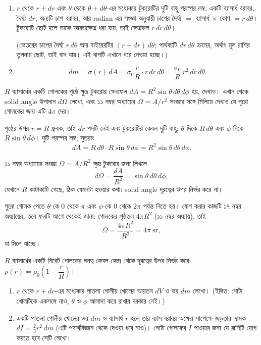 \documentclass[11pt]{article}
\begin{document}
\begin{sol}
\begin{enumerate}
  \item $r$ থেকে $r+dr$ এবং $\theta$ থেকে $\theta+d\theta$-এর মধ্যেকার
        টুকরোটির দুটি বাহু পরস্পর লম্ব: একটি ব্যাসার্ধ বরাবর, দৈর্ঘ্য $dr$;
        অন্যটি চাপ বরাবর, আর radian-এর সংজ্ঞা অনুযায়ী চাপের দৈর্ঘ্য
        $= $ ব্যাসার্ধ $\times$ কোণ $= r\,d\theta$। টুকরোটি ছোট হলে তাকে
        আয়তক্ষেত্র ধরা যায়, তাই ক্ষেত্রফল $r\,dr\,d\theta$।

        (ভেতরের চাপের দৈর্ঘ্য $r\,d\theta$ আর বাইরেরটির $(r+dr)\,d\theta$;
        পার্থক্যটি $dr\,d\theta$ ক্রমের, অর্থাৎ মূল রাশির তুলনায় ছোট, তাই
        বাদ যায়। এই ধাপটি এখানে ধরে নেওয়া হচ্ছে।)
  \item \[
          dm = \sigma(r)\,dA
             = \sigma_{0}\frac{r}{R} \cdot r\,dr\,d\theta
             = \frac{\sigma_{0}}{R}\,r^{2}\,dr\,d\theta .
        \]
\end{enumerate}
\end{sol}

 $R$ ব্যাসার্ধের একটি গোলকের পৃষ্ঠে ক্ষুদ্র টুকরোর ক্ষেত্রফল
$dA = R^{2}\sin\theta\,d\theta\,d\phi$ হয়, দেখাও। এখান থেকে solid angle
উপাদান $d\Omega$ লেখো, এবং ১১ নম্বর অধ্যায়ের $\Omega = A/r^{2}$ সংজ্ঞার
সঙ্গে মিলিয়ে দেখাও যে পুরো গোলকের জন্য এটি $4\pi$ দেয়।

\begin{sol}
পৃষ্ঠের উপর $r = R$ ধ্রুবক, তাই $dr$ পদটি নেই এবং টুকরোটির কেবল দুটি বাহু:
$\theta$ দিকে $R\,d\theta$ এবং $\phi$ দিকে $R\sin\theta\,d\phi$। দুটি পরস্পর
লম্ব, সুতরাং
\[
  dA = R\,d\theta \cdot R\sin\theta\,d\phi = R^{2}\sin\theta\,d\theta\,d\phi .
\]

১১ নম্বর অধ্যায়ের সংজ্ঞা $\Omega = A/R^{2}$ ক্ষুদ্র টুকরোর জন্য লিখলে
\[
  d\Omega = \frac{dA}{R^{2}} = \sin\theta\,d\theta\,d\phi ,
\]
যেখানে $R$ কাটাকাটি গেছে, ঠিক যেমনটা হওয়ার কথা: solid angle দূরত্বের উপর
নির্ভর করে না।

পুরো গোলক পেতে $\theta$-কে $0$ থেকে $\pi$ এবং $\phi$-কে $0$ থেকে $2\pi$
পর্যন্ত নিতে হয়। যোগ করার কাজটি ১৭ নম্বর অধ্যায়ের, তবে ফলটি আগে থেকেই
জানা: গোলকের পৃষ্ঠতল $4\pi R^{2}$ (১১ নম্বর অধ্যায়), তাই
\[
  \Omega = \frac{4\pi R^{2}}{R^{2}} = 4\pi \ \mathrm{sr} ,
\]
যা মিলে যাচ্ছে।
\end{sol}

 $R$ ব্যাসার্ধের একটি নিরেট গোলকের ঘনত্ব কেবল কেন্দ্র থেকে দূরত্বের
উপর নির্ভর করে: $\rho(r) = \rho_{0}\left( 1 - \dfrac{r}{R} \right)$।
\begin{enumerate}
  \item $r$ থেকে $r+dr$-এর মধ্যেকার পাতলা গোলীয় খোলের আয়তন $dV$ ও ভর $dm$
        লেখো। (ইঙ্গিত: গোটা খোলটিকে একসঙ্গে নাও, $\theta$ ও $\phi$ আলাদা করে
        রাখার দরকার নেই।)
  \item একটি পাতলা গোলীয় খোলের ভর $dm$ ও ব্যাসার্ধ $r$ হলে তার ব্যাস বরাবর
        অক্ষের সাপেক্ষে জড়তার ভ্রামক $dI = \tfrac{2}{3}r^{2}\,dm$ (এটি
        পদার্থবিজ্ঞান থেকে দেওয়া ধরে নাও)। গোটা গোলকের $I$ পাওয়ার জন্য যে
        রাশিটি যোগ করতে হবে সেটি লেখো।
\end{enumerate}
\end{document}
